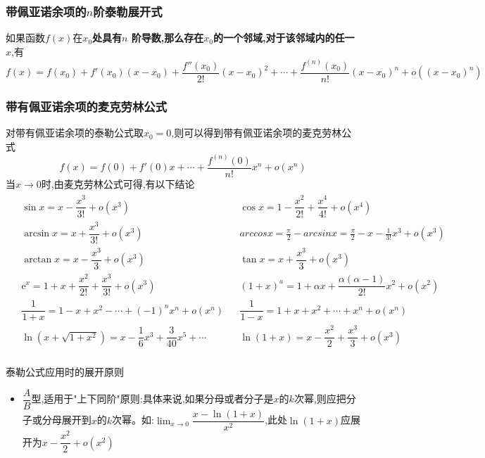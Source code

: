 \documentclass[10pt, a4paper, oneside, UTF8]{ctexbook}
\begin{document}
\begin{sloppypar}
    \subsubsection{带佩亚诺余项的$n$阶泰勒展开式}
    如果函数$f(x)$在\textbf{$x_0$处具有$n$ 阶导数,那么存在$x_{0}$的一个邻域,对于该邻域内的任一 $x$},有
    $$
    f(x)=f(x_{0})+f'(x_{0})(x-x_{0})+\dfrac{f''(x_{0})}{2!}(x-x_{0})^{2}+\cdots+\dfrac{f^{(n)}(x_{0})}{n!}(x-x_{0})^{n}+o\left(\left(x-x_{0}\right)^{n}\right)
    $$
    \subsubsection{带有佩亚诺余项的麦克劳林公式}
    对带有佩亚诺余项的泰勒公式取$x_0=0$,则可以得到带有佩亚诺余项的麦克劳林公式
    $$
    f(x)=f(0)+f'(0)x+\cdots+\dfrac{f^{(n)}(0)}{n!}x^{n}+o(x^{n})
    $$
    当$x\to 0$时,由麦克劳林公式可得,有以下结论
    \begin{align*}
        \boxed{\begin{aligned}
                        & \sin x =x-\dfrac{x^3}{3!}+o(x^3)                                &  & \cos x =1-\dfrac{x^2}{2!}+\dfrac{x^4}{4!}+o(x^4)                  \\
                        & \arcsin x =x+\dfrac{x^3}{3!}+o(x^3)                             &  &                              arccosx=\frac\pi2-arcsinx=\frac\pi2-x-\frac1{3!}x^3+o(x^3)       \\
                        & \arctan x =x-\dfrac{x^{3}}{3}+o(x^{3})                          &  & \tan x =x+\dfrac{x^3}3+o(x^3)              \\
                        & \mathrm{e}^{x} =1+x+\dfrac{x^{2}}{2!}+\dfrac{x^{3}}{3!}+o(x^{3}) &  & (1+x)^{a} =1+\alpha x+\dfrac{\alpha(\alpha-1)}{2!}x^{2}+o(x^{2}) \\
                        & \dfrac{1}{1+x}=1-x+x^{2}-\cdots+(-1)^{n}x^{n}+o(x^{n})          &  &       \dfrac{1}{1-x}=1+x+x^{2}+\cdots+x^{n}+o(x^{n}) \\
                        & \ln (x+\sqrt{1+x^{2}})=x-\dfrac{1}{6}x^{3}+\dfrac{3}{40}x^{5}+\cdots  & & \ln(1+x) =x-\dfrac{x^{2}}{2}+\dfrac{x^{3}}{3}+o(x^{3}) \\
                    \end{aligned}}
    \end{align*}
    \begin{criterion}{泰勒公式应用时的展开原则}{}
        \begin{itemize}
            \item $\dfrac{A}{B}$型,适用于"上下同阶"原则:具体来说,如果分母或者分子是$x$的$k$次幂,则应把分子或分母展开到$x$的$k$次幂。如:$\lim_{x\to0}\dfrac{x-\ln(1+x)}{x^{2}}$,此处$\ln(1+x)$应展开为$x-\dfrac{x^2}{2}+o(x^2)$

\end{itemize}
\end{criterion}
\end{sloppypar}
\end{document}
